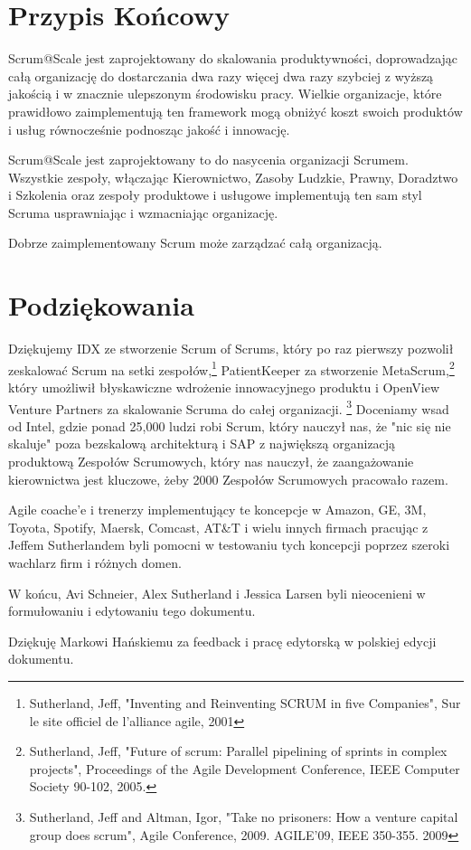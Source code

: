 \documentclass[12pt,a4paper,parskip=full]{scrartcl}
\begin{document}
\section{Przypis Końcowy}

Scrum@Scale jest zaprojektowany do skalowania produktywności, doprowadzając całą organizację do dostarczania dwa razy więcej dwa razy szybciej z wyższą jakością i w znacznie ulepszonym środowisku pracy. Wielkie organizacje, które prawidłowo zaimplementują ten framework mogą obniżyć koszt swoich produktów i usług równocześnie podnosząc jakość i innowację.

Scrum@Scale jest zaprojektowany to do nasycenia organizacji Scrumem. Wszystkie zespoły, włączając Kierownictwo, Zasoby Ludzkie, Prawny, Doradztwo i Szkolenia oraz zespoły produktowe i usługowe implementują ten sam styl Scruma  usprawniając i wzmacniając organizację.

Dobrze zaimplementowany Scrum może zarządzać całą organizacją.

\section{Podziękowania}

Dziękujemy IDX ze stworzenie Scrum of Scrums, który po raz pierwszy pozwolił zeskalować Scrum na setki zespołów,\footnote{Sutherland, Jeff, "Inventing and Reinventing SCRUM in five Companies", Sur le site officiel de l'alliance agile, 2001} PatientKeeper za stworzenie MetaScrum,\footnote{Sutherland, Jeff, "Future of scrum: Parallel pipelining of sprints in complex projects", Proceedings of the Agile Development Conference,  IEEE Computer Society 90-102,  2005.} który umożliwił błyskawiczne wdrożenie innowacyjnego produktu i OpenView Venture Partners za skalowanie Scruma do całej organizacji. \footnote{Sutherland, Jeff and Altman, Igor, "Take no prisoners: How a venture capital group does scrum", Agile Conference, 2009. AGILE'09, IEEE 350-355.  2009} Doceniamy wsad od Intel, gdzie ponad 25,000 ludzi robi Scrum, który nauczył nas, że "nic się nie skaluje" poza bezskalową architekturą i SAP z największą organizacją produktową Zespołów Scrumowych, który nas nauczył, że zaangażowanie kierownictwa jest kluczowe, żeby 2000 Zespołów Scrumowych pracowało razem.

Agile coache'e i trenerzy implementujący te koncepcje w Amazon, GE, 3M, Toyota, Spotify, Maersk, Comcast, AT\&T i wielu innych firmach pracując z Jeffem Sutherlandem byli pomocni w testowaniu tych koncepcji poprzez szeroki wachlarz firm i różnych domen.

W końcu, Avi Schneier, Alex Sutherland i Jessica Larsen byli nieocenieni w formułowaniu i edytowaniu tego dokumentu.

Dziękuję Markowi Hańskiemu za feedback i pracę edytorską w polskiej edycji dokumentu.

\pagebreak

\printbibliography
\end{document}
